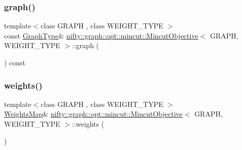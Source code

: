 \subsubsection{\texorpdfstring{graph()}{graph()}}
{\footnotesize\ttfamily template$<$class G\+R\+A\+PH , class W\+E\+I\+G\+H\+T\+\_\+\+T\+Y\+PE $>$ \\
const \hyperlink{classnifty_1_1graph_1_1opt_1_1mincut_1_1MincutObjective_a3dbd0ae2a00c363dea7dcf771d0269dc}{Graph\+Type}\& \hyperlink{classnifty_1_1graph_1_1opt_1_1mincut_1_1MincutObjective}{nifty\+::graph\+::opt\+::mincut\+::\+Mincut\+Objective}$<$ G\+R\+A\+PH, W\+E\+I\+G\+H\+T\+\_\+\+T\+Y\+PE $>$\+::graph (\begin{DoxyParamCaption}{ }\end{DoxyParamCaption}) const\hspace{0.3cm}{\ttfamily [inline]}}

\mbox{\label{classnifty_1_1graph_1_1opt_1_1mincut_1_1MincutObjective_a7d61f27a21fa2c77a1d76d23e83ef821}} 
\subsubsection{\texorpdfstring{weights()}{weights()}\hspace{0.1cm}{\footnotesize\ttfamily [1/2]}}
{\footnotesize\ttfamily template$<$class G\+R\+A\+PH , class W\+E\+I\+G\+H\+T\+\_\+\+T\+Y\+PE $>$ \\
\hyperlink{classnifty_1_1graph_1_1opt_1_1mincut_1_1MincutObjective_a012cbd01da7133bf0824f41af40adafb}{Weights\+Map}\& \hyperlink{classnifty_1_1graph_1_1opt_1_1mincut_1_1MincutObjective}{nifty\+::graph\+::opt\+::mincut\+::\+Mincut\+Objective}$<$ G\+R\+A\+PH, W\+E\+I\+G\+H\+T\+\_\+\+T\+Y\+PE $>$\+::weights (\begin{DoxyParamCaption}{ }\end{DoxyParamCaption})\hspace{0.3cm}{\ttfamily [inline]}}

\mbox{\label{classnifty_1_1graph_1_1opt_1_1mincut_1_1MincutObjective_a473e0dbc73e118e539ec0e690f41b6c8}} 

